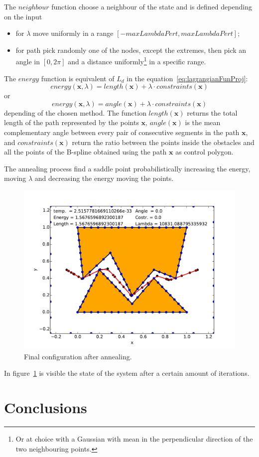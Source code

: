 \documentclass[a4paper]{article}
\begin{document}
The $neighbour$ function choose a neighbour of the state and is
defined depending on the input
\begin{itemize}
  \item for $\lambda$ move uniformly in a range $[-maxLambdaPert, maxLambdaPert]$;
  \item for path pick randomly one of the nodes, except the extremes,
    then pick an angle in $[0,2\pi]$ and a distance
    uniformly\footnote{Or at choice with a
      Gaussian with mean in the perpendicular direction of the two
      neighbouring points.} in a specific range.
\end{itemize}

The $energy$ function is equivalent of $L_d$ in the
equation~\eqref{eq:lagrangianFunProj}:
$$energy(\mathbf{x},\lambda)=length(\mathbf{x})+\lambda\cdot
constraints(\mathbf{x})$$
or
$$energy(\mathbf{x},\lambda)=angle(\mathbf{x})+\lambda\cdot
constraints(\mathbf{x})$$
depending of the chosen method. The function $length(\mathbf{x})$
returns the total length of the path represented by the points
$\mathbf{x}$, $angle(\mathbf{x})$ is the mean complementary angle between
every pair of consecutive segments in the path $\mathbf{x}$, and
$constraints(\mathbf{x})$ return the ratio between the points inside the
obstacles and all the points of the
B-spline obtained using the path $\mathbf{x}$ as control polygon.

The annealing process
find a saddle point probabilistically increasing the energy, moving
$\lambda$ and 
decreasing the energy moving the points.

\begin{figure}[htb]
  \centering
  \includegraphics[width=\textwidth]{img/final.pdf}
  \caption{Final configuration after annealing.}
  \label{fig:final}
\end{figure}
In figure~\ref{fig:final} is visible the state of the system after a
certain amount of iterations.

\section{Conclusions}

\nocite{*}
{}


\end{document}
